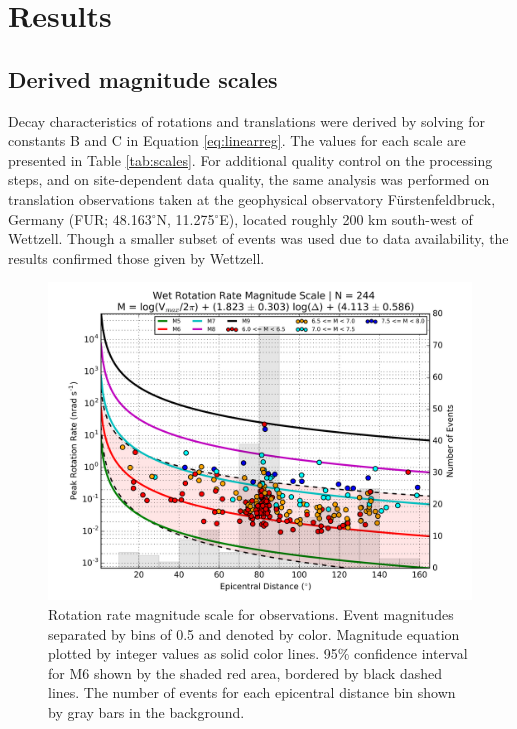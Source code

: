 \documentclass{gji}
\begin{document}
\section{Results}\label{sec:results}
\subsection{Derived magnitude scales}
Decay characteristics of rotations and translations were derived by solving for constants B and C in Equation \ref{eq:linearreg}. The values for each scale are presented in Table \ref{tab:scales}. For additional quality control on the processing steps, and on site-dependent data quality, the same analysis was performed on translation observations taken at the geophysical observatory F\"urstenfeldbruck, Germany (FUR; 48.163$^\circ$N, 11.275$^\circ$E), located roughly 200 km south-west of Wettzell. Though a smaller subset of events was used due to data availability, the results confirmed those given by Wettzell. 


\begin{figure}
\centerline{\includegraphics[width=.8\textwidth]{rr_obs}}
\caption{Rotation rate magnitude scale for observations. Event magnitudes separated by bins of 0.5 and denoted by color. Magnitude equation plotted by integer values as solid color lines. 95\% confidence interval for M6 shown by the shaded red area, bordered by black dashed lines. The number of events for each epicentral distance bin shown by gray bars in the background.}
\label{fig:rr_obs}
\end{figure}
\end{document}
